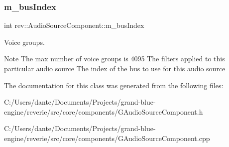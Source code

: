 \subsubsection{\texorpdfstring{m\_busIndex}{m\_busIndex}}
{\footnotesize\ttfamily int rev\+::\+Audio\+Source\+Component\+::m\+\_\+bus\+Index\hspace{0.3cm}{\ttfamily [protected]}}



Voice groups. 

\begin{DoxyNote}{Note}
The max number of voice groups is 4095 The filters applied to this particular audio source The index of the bus to use for this audio source 
\end{DoxyNote}


The documentation for this class was generated from the following files\+:\begin{DoxyCompactItemize}
\item 
C\+:/\+Users/dante/\+Documents/\+Projects/grand-\/blue-\/engine/reverie/src/core/components/G\+Audio\+Source\+Component.\+h\item 
C\+:/\+Users/dante/\+Documents/\+Projects/grand-\/blue-\/engine/reverie/src/core/components/G\+Audio\+Source\+Component.\+cpp\end{DoxyCompactItemize}

